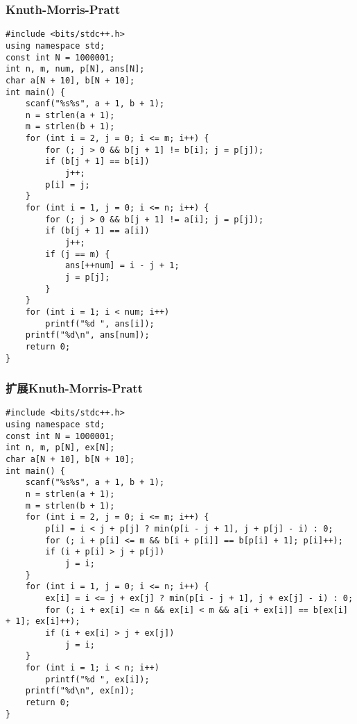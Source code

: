 \documentclass[a4paper]{article}
\begin{document}
\subsubsection{Knuth-Morris-Pratt}
\begin{lstlisting}
#include <bits/stdc++.h>
using namespace std;
const int N = 1000001;
int n, m, num, p[N], ans[N];
char a[N + 10], b[N + 10];
int main() {
    scanf("%s%s", a + 1, b + 1);
    n = strlen(a + 1);
    m = strlen(b + 1);
    for (int i = 2, j = 0; i <= m; i++) {
        for (; j > 0 && b[j + 1] != b[i]; j = p[j]);
        if (b[j + 1] == b[i])
            j++;
        p[i] = j;
    }
    for (int i = 1, j = 0; i <= n; i++) {
        for (; j > 0 && b[j + 1] != a[i]; j = p[j]);
        if (b[j + 1] == a[i])
            j++;
        if (j == m) {
            ans[++num] = i - j + 1;
            j = p[j];
        }
    }
    for (int i = 1; i < num; i++)
        printf("%d ", ans[i]);
    printf("%d\n", ans[num]);
    return 0;
}
\end{lstlisting}
\subsubsection{扩展Knuth-Morris-Pratt}
\begin{lstlisting}
#include <bits/stdc++.h>
using namespace std;
const int N = 1000001;
int n, m, p[N], ex[N];
char a[N + 10], b[N + 10];
int main() {
    scanf("%s%s", a + 1, b + 1);
    n = strlen(a + 1);
    m = strlen(b + 1);
    for (int i = 2, j = 0; i <= m; i++) {
        p[i] = i < j + p[j] ? min(p[i - j + 1], j + p[j] - i) : 0;
        for (; i + p[i] <= m && b[i + p[i]] == b[p[i] + 1]; p[i]++);
        if (i + p[i] > j + p[j])
            j = i;
    }
    for (int i = 1, j = 0; i <= n; i++) {
        ex[i] = i <= j + ex[j] ? min(p[i - j + 1], j + ex[j] - i) : 0;
        for (; i + ex[i] <= n && ex[i] < m && a[i + ex[i]] == b[ex[i] + 1]; ex[i]++);
        if (i + ex[i] > j + ex[j])
            j = i;
    }
    for (int i = 1; i < n; i++)
        printf("%d ", ex[i]);
    printf("%d\n", ex[n]);
    return 0;
}
\end{lstlisting}
\end{document}
